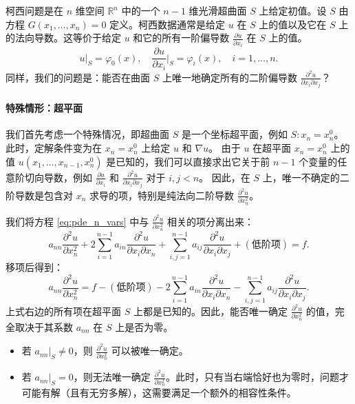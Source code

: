 \documentclass[12pt,a4paper]{article}
\newcommand{\R}{\mathbb{R}}
\numberwithin{subsection}{section}
\numberwithin{subsubsection}{subsection}
\theoremstyle{plain}
\theoremstyle{definition}
\theoremstyle{remark}
\begin{document}
	柯西问题是在 \(n\) 维空间 \(\R^n\) 中的一个 \(n-1\) 维光滑超曲面 \(S\) 上给定初值。设 \(S\) 由方程 \(G(x_1, \dots, x_n) = 0\) 定义。柯西数据通常是给定 \(u\) 在 \(S\) 上的值以及它在 \(S\) 上的法向导数。这等价于给定 \(u\) 和它的所有一阶偏导数 \(\frac{\partial u}{\partial x_i}\) 在 \(S\) 上的值。
	\begin{equation}\label{eq:cauchy_n_vars}
		u|_{S} = \varphi_0(x), \quad \frac{\partial u}{\partial x_i}\bigg|_{S} = \varphi_i(x), \quad i=1, \dots, n.
	\end{equation}
	同样，我们的问题是：能否在曲面 \(S\) 上唯一地确定所有的二阶偏导数 \(\frac{\partial^2 u}{\partial x_i \partial x_j}\)？
	
	\paragraph{特殊情形：超平面}
	我们首先考虑一个特殊情况，即超曲面 \(S\) 是一个坐标超平面，例如 \(S: x_n = x_n^0\)。此时，定解条件变为在 \(x_n=x_n^0\) 上给定 \(u\) 和 \(\nabla u\)。
	由于 \(u\) 在超平面 \(x_n=x_n^0\) 上的值 \(u(x_1, \dots, x_{n-1}, x_n^0)\) 是已知的，我们可以直接求出它关于前 \(n-1\) 个变量的任意阶切向导数，例如 \(\frac{\partial u}{\partial x_i}\) 和 \(\frac{\partial^2 u}{\partial x_i \partial x_j}\) 对于 \(i,j < n\)。
	因此，在 \(S\) 上，唯一不确定的二阶导数是包含对 \(x_n\) 求导的项，特别是纯法向二阶导数 \(\frac{\partial^2 u}{\partial x_n^2}\)。
	
	我们将方程 \eqref{eq:pde_n_vars} 中与 \(\frac{\partial^2 u}{\partial x_n^2}\) 相关的项分离出来：
	\[
	a_{nn} \frac{\partial^2 u}{\partial x_n^2} + 2\sum_{i=1}^{n-1} a_{in} \frac{\partial^2 u}{\partial x_i \partial x_n} + \sum_{i,j=1}^{n-1} a_{ij} \frac{\partial^2 u}{\partial x_i \partial x_j} + (\text{低阶项}) = f.
	\]
	移项后得到：
	\[
	a_{nn} \frac{\partial^2 u}{\partial x_n^2} = f - (\text{低阶项}) - 2\sum_{i=1}^{n-1} a_{in} \frac{\partial^2 u}{\partial x_i \partial x_n} - \sum_{i,j=1}^{n-1} a_{ij} \frac{\partial^2 u}{\partial x_i \partial x_j}.
	\]
	上式右边的所有项在超平面 \(S\) 上都是已知的。因此，能否唯一确定 \(\frac{\partial^2 u}{\partial x_n^2}\) 的值，完全取决于其系数 \(a_{nn}\) 在 \(S\) 上是否为零。
	\begin{itemize}
		\item 若 \(a_{nn}|_S \neq 0\)，则 \(\frac{\partial^2 u}{\partial x_n^2}\) 可以被唯一确定。
		\item 若 \(a_{nn}|_S = 0\)，则无法唯一确定 \(\frac{\partial^2 u}{\partial x_n^2}\)。此时，只有当右端恰好也为零时，问题才可能有解（且有无穷多解），这需要满足一个额外的相容性条件。
	\end{itemize}
	
\end{document}
